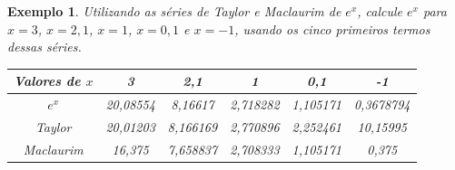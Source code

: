 \documentclass[12pt,a4paper]{book}
\newtheorem{example}{Exemplo}
\begin{document}
\begin{example}
    Utilizando as séries de Taylor e Maclaurim de $e^x$, calcule $e^x$ para $x=3$, $x=2,1$, $x=1$, $x=0,1$ e $x=-1$, usando os cinco primeiros termos dessas séries.

	\begin{center}
    	\begin{tabular}{|c|c|c|c|c|c|}
	    	\hline
        	Valores de $x$ & 3 & 2,1 & 1 & 0,1 & -1\\
    	    \hline
	        $e^x$     & 20,08554 & 8,16617  & 2,718282 & 1,105171 & 0,3678794 \\
        	\hline
    	    Taylor    & 20,01203 & 8,166169 & 2,770896 & 2,252461 & 10,15995  \\
        	\hline
	        Maclaurim & 16,375   & 7,658837 & 2,708333 & 1,105171 & 0,375     \\
    	    \hline
	    \end{tabular}
	\end{center}
\end{example}
\end{document}
